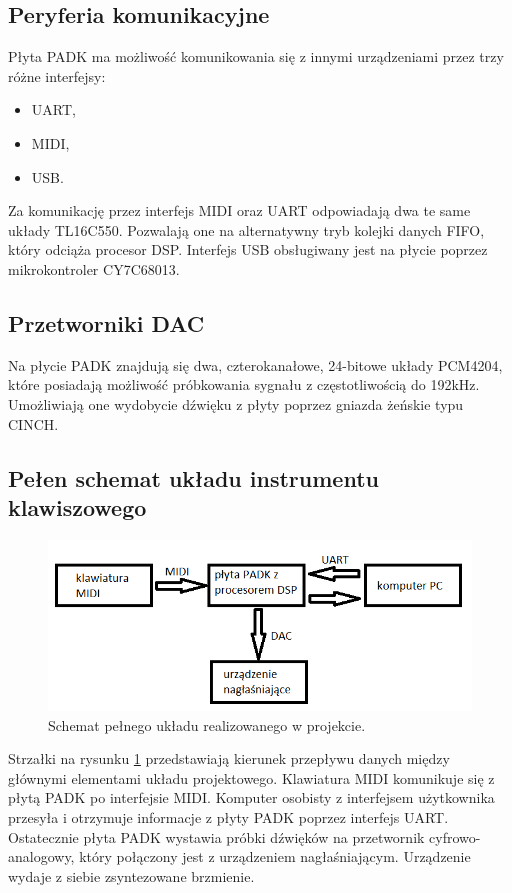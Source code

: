 \subsection{Peryferia komunikacyjne}
Płyta PADK ma możliwość komunikowania się z innymi urządzeniami przez trzy różne interfejsy:
\begin{itemize}
	\item UART,
	\item MIDI,
	\item USB.
\end{itemize}
Za komunikację przez interfejs MIDI oraz UART odpowiadają dwa te same układy TL16C550. Pozwalają one na alternatywny tryb kolejki danych FIFO, który odciąża procesor DSP. Interfejs USB obsługiwany jest na płycie poprzez mikrokontroler CY7C68013.

\subsection{Przetworniki DAC}
Na płycie PADK znajdują się dwa, czterokanałowe, 24-bitowe układy PCM4204, które posiadają możliwość próbkowania sygnału z częstotliwością do 192kHz. Umożliwiają one wydobycie dźwięku z płyty poprzez gniazda żeńskie typu CINCH.

\subsection{Pełen schemat układu instrumentu klawiszowego}
\begin{figure}[H]
	\centering
	\includegraphics[width=12cm]{./grafiki/real_pelen_uklad}
	\captionsetup{justification=centering}
	\caption{Schemat pełnego układu realizowanego w projekcie.}
	\label{rys:real_uklad}
\end{figure}
Strzałki na rysunku \ref{rys:real_uklad} przedstawiają kierunek przepływu danych między głównymi elementami układu projektowego. Klawiatura MIDI komunikuje się z płytą PADK po interfejsie MIDI. Komputer osobisty z interfejsem użytkownika przesyła i otrzymuje informacje z płyty PADK poprzez interfejs UART. Ostatecznie płyta PADK wystawia próbki dźwięków na przetwornik cyfrowo-analogowy, który połączony jest z urządzeniem nagłaśniającym. Urządzenie wydaje z siebie zsyntezowane brzmienie.

